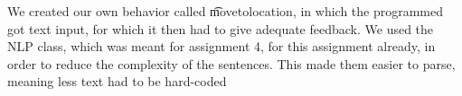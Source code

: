 
We created our own behavior called \t{movetolocation}, in which the programmed got text input, for which it then had to give adequate feedback. We used the NLP class, which was meant for assignment 4, for this assignment already, in order to reduce the complexity of the sentences. This made them easier to parse, meaning less text had to be hard-coded

